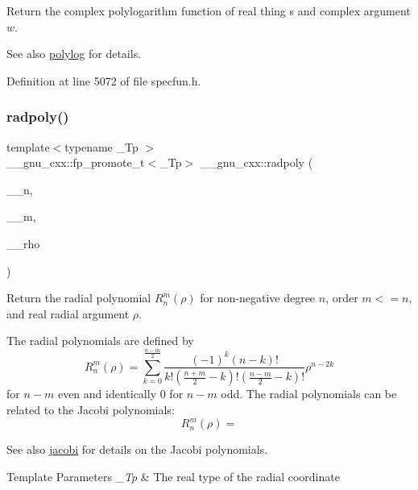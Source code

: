 Return the complex polylogarithm function of real thing {\ttfamily s} and complex argument $ w $.

\begin{DoxySeeAlso}{See also}
\hyperlink{group__gnu__math__spec__func_gabcc5480ad739561c2debd6a8a352084f}{polylog} for details. 
\end{DoxySeeAlso}


Definition at line 5072 of file specfun.\+h.

\mbox{\label{group__gnu__math__spec__func_ga195db2592888b7a8df870d9eaeff8d05}} 
\subsubsection{\texorpdfstring{radpoly()}{radpoly()}}
{\footnotesize\ttfamily template$<$typename \+\_\+\+Tp $>$ \\
\+\_\+\+\_\+gnu\+\_\+cxx\+::fp\+\_\+promote\+\_\+t$<$\+\_\+\+Tp$>$ \+\_\+\+\_\+gnu\+\_\+cxx\+::radpoly (\begin{DoxyParamCaption}\item[{unsigned int}]{\+\_\+\+\_\+n,  }\item[{unsigned int}]{\+\_\+\+\_\+m,  }\item[{\+\_\+\+Tp}]{\+\_\+\+\_\+rho }\end{DoxyParamCaption})\hspace{0.3cm}{\ttfamily [inline]}}

Return the radial polynomial $ R_n^m(\rho) $ for non-\/negative degree $ n $, order $ m <= n $, and real radial argument $ \rho $.

The radial polynomials are defined by \[ R_n^m(\rho) = \sum_{k=0}^{\frac{n-m}{2}} \frac{(-1)^k(n-k)!}{k!(\frac{n+m}{2}-k)!(\frac{n-m}{2}-k)!} \rho^{n-2k} \] for $ n - m $ even and identically 0 for $ n - m $ odd. The radial polynomials can be related to the Jacobi polynomials\+: \[ R_n^m(\rho) = \] \begin{DoxySeeAlso}{See also}
\hyperlink{group__gnu__math__spec__func_gad54f6601748324d268532138eb38ca33}{jacobi} for details on the Jacobi polynomials.
\end{DoxySeeAlso}

\begin{DoxyTemplParams}{Template Parameters}
{\em \+\_\+\+Tp} & The real type of the radial coordinate \\
\hline
\end{DoxyTemplParams}

